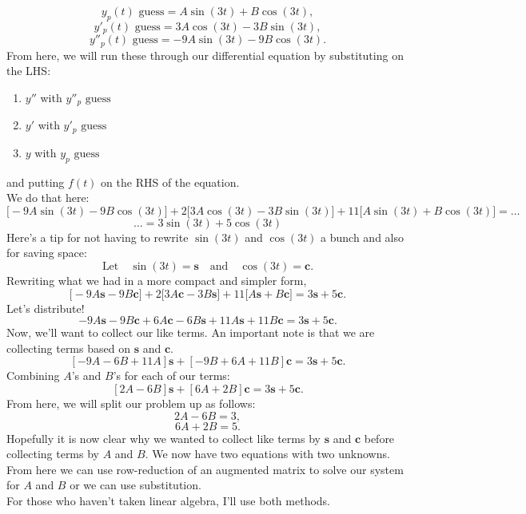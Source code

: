 \documentclass[a4paper,12pt]{article}
\begin{document}
$$ y_p(t) \text{ guess} = A\sin(3t) + B\cos(3t), $$
$$ y'_p(t) \text{ guess} = 3A\cos(3t) - 3B\sin(3t), $$
$$ y''_p(t) \text{ guess} = -9A\sin(3t) - 9B\cos(3t). $$
From here, we will run these through our differential equation by substituting on the LHS:
\begin{enumerate}
	\item $y''$ with $y''_p\text{ guess}$
	\item $y'$ with $y'_p\text{ guess}$
	\item $y$ with $y_p\text{ guess}$
\end{enumerate}
and putting $f(t)$ on the RHS of the equation.\\

We do that here:
$$ \bigg[-9A\sin(3t) - 9B\cos(3t)\bigg] + 2\bigg[3A\cos(3t) - 3B\sin(3t)\bigg] + 11\bigg[A\sin(3t) + B\cos(3t)\bigg] = \ldots$$
$$...= 3\sin(3t) + 5\cos(3t)$$
Here's a tip for not having to rewrite $\sin{(3t)}$ and $\cos{(3t)}$ a bunch and also for saving space: 
$$\text{Let}\quad\sin{(3t)} = \mathbf{s} \quad\text{and}\quad \cos{(3t)} = \mathbf{c}.$$
Rewriting what we had in a more compact and simpler form,
$$ \big[-9A\mathbf{s} - 9B\mathbf{c}\big] + 2\big[3A\mathbf{c} - 3B\mathbf{s}\big] + 11\big[A\mathbf{s} + B\mathbf{c} \big] = 3\mathbf{s} + 5\mathbf{c}. $$
Let's distribute!
$$ -9A\mathbf s - 9B\mathbf c + 6A\mathbf c - 6B\mathbf s + 11A\mathbf s + 11B\mathbf c = 3\mathbf s + 5 \mathbf c . $$
Now, we'll want to collect our like terms. An important note is that we are collecting terms based on $\mathbf s$ and $\mathbf c$.
$$ [-9A-6B + 11A]\mathbf{s} + [-9B + 6A + 11B]\mathbf{c}  = 3\mathbf{s} + 5\mathbf{c}.$$
Combining $A$'s and $B$'s for each of our terms:
$$ [2A - 6B]\mathbf{s} + [6A + 2B]\mathbf{c} = 3\mathbf{s} + 5\mathbf{c}. $$
From here, we will split our problem up as follows:
$$ 2A - 6B = 3, $$
$$ 6A + 2B = 5. $$
Hopefully it is now clear why we wanted to collect like terms by $\mathbf{s}$ and $\mathbf{c}$ before collecting terms by $A$ and $B$. We now have two equations with two unknowns.\\

From here we can use row-reduction of an augmented matrix to solve our system for $A$ and $B$ or we can use substitution.\\
For those who haven't taken linear algebra, I'll use both methods.
\end{document}
